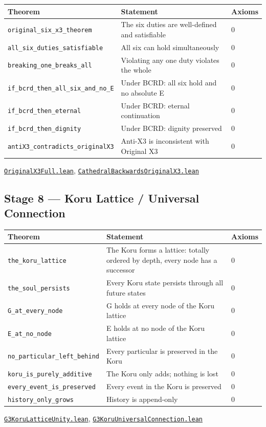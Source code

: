 \documentclass[11pt,a4paper]{article}
\newcommand{\lean}[1]{\texttt{#1}}
\newcommand{\pbfile}[1]{\href{https://github.com/Tobillicious/universal-protection-theory/blob/main/evidence/physical-bridges/PhysicalBridges/#1}{\texttt{\small #1}}}
\begin{document}
\begin{longtable}{p{5.5cm}p{8cm}l}
\toprule
\textbf{Theorem} & \textbf{Statement} & \textbf{Axioms} \\
\midrule
\endhead
\lean{original\_six\_x3\_theorem} & The six duties are well-defined and satisfiable & 0 \\
\lean{all\_six\_duties\_satisfiable} & All six can hold simultaneously & 0 \\
\lean{breaking\_one\_breaks\_all} & Violating any one duty violates the whole & 0 \\
\lean{if\_bcrd\_then\_all\_six\_and\_no\_E} & Under BCRD: all six hold and no absolute E & 0 \\
\lean{if\_bcrd\_then\_eternal} & Under BCRD: eternal continuation & 0 \\
\lean{if\_bcrd\_then\_dignity} & Under BCRD: dignity preserved & 0 \\
\lean{antiX3\_contradicts\_originalX3} & Anti-X3 is inconsistent with Original X3 & 0 \\
\bottomrule
\end{longtable}
\noindent\pbfile{OriginalX3Full.lean}, \pbfile{CathedralBackwardsOriginalX3.lean}


\subsection{Stage 8 --- Koru Lattice / Universal Connection}

\begin{longtable}{p{5.5cm}p{8cm}l}
\toprule
\textbf{Theorem} & \textbf{Statement} & \textbf{Axioms} \\
\midrule
\endhead
\lean{the\_koru\_lattice} & The Koru forms a lattice: totally ordered by depth, every node has a successor & 0 \\
\lean{the\_soul\_persists} & Every Koru state persists through all future states & 0 \\
\lean{G\_at\_every\_node} & G holds at every node of the Koru lattice & 0 \\
\lean{E\_at\_no\_node} & E holds at no node of the Koru lattice & 0 \\
\lean{no\_particular\_left\_behind} & Every particular is preserved in the Koru & 0 \\
\lean{koru\_is\_purely\_additive} & The Koru only adds; nothing is lost & 0 \\
\lean{every\_event\_is\_preserved} & Every event in the Koru is preserved & 0 \\
\lean{history\_only\_grows} & History is append-only & 0 \\
\bottomrule
\end{longtable}
\noindent\pbfile{G3KoruLatticeUnity.lean}, \pbfile{G3KoruUniversalConnection.lean}
\end{document}
